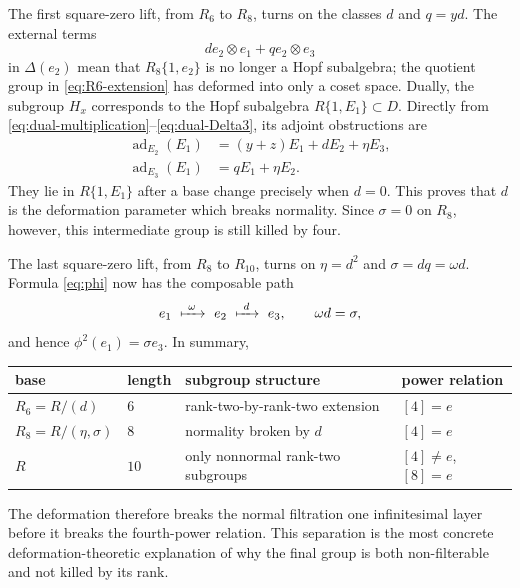 \documentclass[11pt]{article}
\theoremstyle{remark}
\begin{document}
The first square-zero lift, from \(R_6\) to \(R_8\), turns on the classes
\(d\) and \(q=yd\).  The external terms
\begin{equation}\label{eq:normality-breaking-terms}
 d e_2\otimes e_1+q e_2\otimes e_3
\end{equation}
in \(\Delta(e_2)\) mean that \(R_8\{1,e_2\}\) is no longer a Hopf
subalgebra; the quotient group in \eqref{eq:R6-extension} has deformed into
only a coset space.  Dually, the subgroup \(H_x\) corresponds to the Hopf
subalgebra \(R\{1,E_1\}\subset D\).  Directly from
\eqref{eq:dual-multiplication}--\eqref{eq:dual-Delta3}, its adjoint
obstructions are
\begin{equation}\label{eq:dual-adjoint-normality}
\begin{aligned}
 \operatorname{ad}_{E_2}(E_1)
  &=(y+z)E_1+dE_2+\eta E_3,\\
 \operatorname{ad}_{E_3}(E_1)
  &=qE_1+\eta E_2.
\end{aligned}
\end{equation}
They lie in \(R\{1,E_1\}\) after a base change precisely when \(d=0\).
This proves that \(d\) is the deformation parameter which breaks
normality.  Since \(\sigma=0\) on \(R_8\), however, this intermediate group
is still killed by four.

The last square-zero lift, from \(R_8\) to \(R_{10}\), turns on
\(\eta=d^2\) and \(\sigma=dq=\omega d\).  Formula \eqref{eq:phi} now has
the composable path
\begin{equation}\label{eq:deformation-path}
 e_1\ \xmapsto{\ \omega\ }\ e_2
 \ \xmapsto{\ d\ }\ e_3,
 \qquad \omega d=\sigma,
\end{equation}
and hence \(\phi^2(e_1)=\sigma e_3\).  In summary,
\begin{center}
\begin{tabular}{@{}llll@{}}
\toprule
base & length & subgroup structure & power relation\\
\midrule
\(R_6=R/(d)\) & \(6\) & rank-two-by-rank-two extension & \([4]=e\)\\
\(R_8=R/(\eta,\sigma)\) & \(8\) & normality broken by \(d\) & \([4]=e\)\\
\(R\) & \(10\) & only nonnormal rank-two subgroups & \([4]\ne e\), \([8]=e\)\\
\bottomrule
\end{tabular}
\end{center}
The deformation therefore breaks the normal filtration one infinitesimal
layer before it breaks the fourth-power relation.  This separation is the
most concrete deformation-theoretic explanation of why the final group is
both non-filterable and not killed by its rank.
\end{document}

